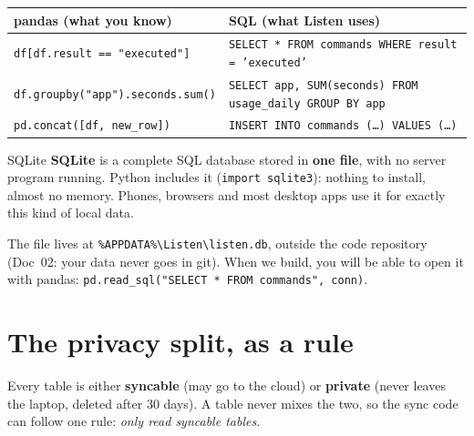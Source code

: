 \documentclass[11pt,a4paper]{article}
\begin{document}
\begin{center}
\renewcommand{\arraystretch}{1.2}
\begin{tabularx}{\textwidth}{X X}
\toprule
\textbf{pandas (what you know)} & \textbf{SQL (what Listen uses)} \\
\midrule
\texttt{df[df.result == "executed"]} & \texttt{SELECT * FROM commands WHERE result = 'executed'} \\
\texttt{df.groupby("app").seconds.sum()} & \texttt{SELECT app, SUM(seconds) FROM usage\_daily GROUP BY app} \\
\texttt{pd.concat([df, new\_row])} & \texttt{INSERT INTO commands (\ldots) VALUES (\ldots)} \\
\bottomrule
\end{tabularx}
\end{center}

\begin{concept}{SQLite}
\textbf{SQLite} is a complete SQL database stored in \textbf{one file}, with no server program
running. Python includes it (\texttt{import sqlite3}): nothing to install, almost no memory.
Phones, browsers and most desktop apps use it for exactly this kind of local data.
\end{concept}

\noindent The file lives at \texttt{\%APPDATA\%\textbackslash Listen\textbackslash listen.db},
outside the code repository (Doc~02: your data never goes in git). When we build, you will be
able to open it with pandas: \texttt{pd.read\_sql("SELECT * FROM commands", conn)}.

\section{The privacy split, as a rule}

Every table is either \textcolor{cloud}{\textbf{syncable}} (may go to the cloud) or
\textcolor{warn}{\textbf{private}} (never leaves the laptop, deleted after 30 days). A table
never mixes the two, so the sync code can follow one rule: \emph{only read syncable tables}.
\end{document}
